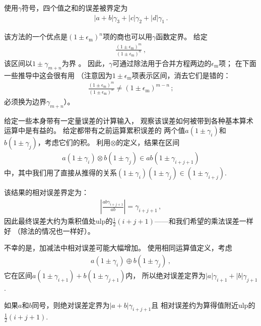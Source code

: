 使用$\gamma$符号，四个值之和的误差被界定为
\begin{align*}
    |a+b|\gamma_3+|c|\gamma_2+|d|\gamma_1\, .
\end{align*}

该方法的一个优点是$(1\pm\epsilon_{\mathrm{m}})^n$项的商也可以用$\gamma$函数定界。
给定
\begin{align*}
    \frac{(1\pm\epsilon_{\mathrm{m}})^m}{(1\pm\epsilon_{\mathrm{m}})^n}\, ,
\end{align*}
该区间以$1\pm\gamma_{m+n}$为界
。
因此，$\gamma$可通过除法用于合并方程两边的$\epsilon_{\mathrm{m}}$项；
在下面一些推导中这会很有用
（注意因为$1\pm\epsilon_{\mathrm{m}}$项表示区间，消去它们是错的：
\begin{align*}
    \frac{(1\pm\epsilon_{\mathrm{m}})^m}{(1\pm\epsilon_{\mathrm{m}})^n}\neq(1\pm\epsilon_{\mathrm{m}})^{m-n}\, ;
\end{align*}
必须换为边界$\gamma_{m+n}$）。

给定一些本身带有一定量误差的计算输入，
观察该误差如何被带到各种基本算术运算中是有益的。
给定都带有之前运算累积误差的
两个值$a(1\pm\gamma_i)$和$b(1\pm\gamma_j)$，考虑它们的积。
利用$\otimes$的定义，结果在区间
\begin{align*}
    a(1\pm\gamma_i)\otimes b(1\pm\gamma_j)\in ab(1\pm\gamma_{i+j+1})
\end{align*}
中，其中我们用了直接从推得的关系$(1\pm\gamma_i)(1\pm\gamma_j)\in(1\pm\gamma_{i+j})$.

该结果的相对误差界定为：
\begin{align*}
    \left|\frac{ab\gamma_{i+j+1}}{ab}\right|=\gamma_{i+j+1}\, ,
\end{align*}
因此最终误差大约为乘积值处ulp的$\displaystyle\frac{1}{2}(i+j+1)$——和我们希望的乘法误差一样好
（除法的情况也一样好）。

不幸的是，加减法中相对误差可能大幅增加。
使用相同运算值定义，考虑
\begin{align*}
    a(1\pm\gamma_i)\oplus b(1\pm\gamma_j)\, ,
\end{align*}
它在区间$a(1\pm\gamma_{i+1})+b(1\pm\gamma_{j+1})$内，
所以绝对误差定界为$|a|\gamma_{i+1}+|b|\gamma_{j+1}$.

如果$a$和$b$同号，则绝对误差定界为$|a+b|\gamma_{i+j+1}$且
相对误差约为算得值附近ulp的$\displaystyle\frac{1}{2}(i+j+1)$.

